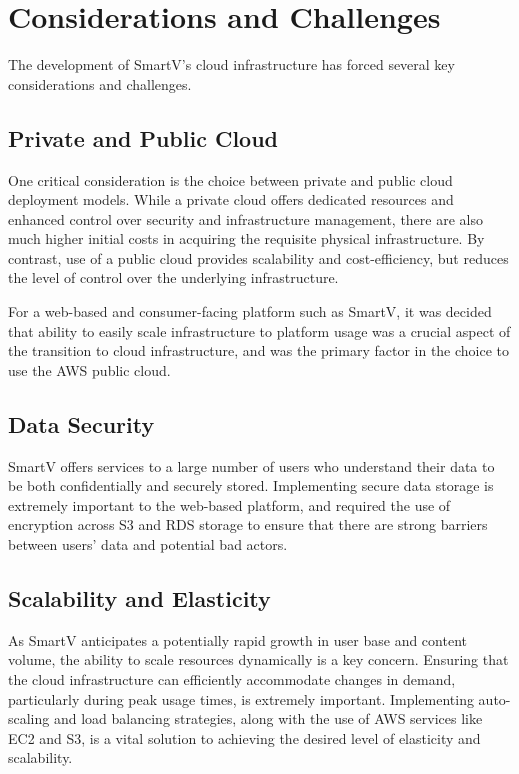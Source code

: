 \section{Considerations and Challenges}

The development of SmartV's cloud infrastructure has forced several key considerations and challenges.

\subsection{Private and Public Cloud}

One critical consideration is the choice between private and public cloud deployment models. While a private cloud offers dedicated resources and enhanced control over security and infrastructure management, there are also much higher initial costs in acquiring the requisite physical infrastructure. By contrast, use of a public cloud provides scalability and cost-efficiency, but reduces the level of control over the underlying infrastructure.

For a web-based and consumer-facing platform such as SmartV, it was decided that ability to easily scale infrastructure to platform usage was a crucial aspect of the transition to cloud infrastructure, and was the primary factor in the choice to use the AWS public cloud.

\subsection{Data Security}

SmartV offers services to a large number of users who understand their data to be both confidentially and securely stored. Implementing secure data storage is extremely important to the web-based platform, and required the use of encryption across S3 and RDS storage to ensure that there are strong barriers between users' data and potential bad actors.

\subsection{Scalability and Elasticity}

As SmartV anticipates a potentially rapid growth in user base and content volume, the ability to scale resources dynamically is a key concern. Ensuring that the cloud infrastructure can efficiently accommodate changes in demand, particularly during peak usage times, is extremely important. Implementing auto-scaling and load balancing strategies, along with the use of AWS services like EC2 and S3, is a vital solution to achieving the desired level of elasticity and scalability.